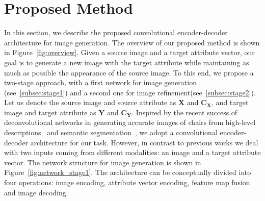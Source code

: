 \documentclass[10pt,twocolumn,letterpaper]{article}
\begin{document}
\section{Proposed Method}
\label{sec:method}
In this section, we describe the proposed convolutional encoder-decoder architecture for image generation. The overview of our proposed method is shown in Figure~\ref{fig:overview}.
Given a source image and a target attribute vector, our goal is to generate a new image with the target attribute while maintaining as much as possible the appearance of the source image. To this end, we propose a two-stage approach, with a first network for image generation (see~\ref{subsec:stage1}) and a second one for image refinement(see~\ref{subsec:stage2}).
Let us denote the source image and source attribute as $\mathbf{X}$ and $\mathbf{C_X}$, and target image and target attribute as $\mathbf{Y}$ and $\mathbf{C_Y}$.
Inspired by the recent success of deconvolutional networks in generating accurate images of chairs
from high-level descriptions~\cite{Dosovitskiy-cvpr15} and semantic segmentation~\cite{Long-cvpr15,Noh-iccv15},
we adopt a convolutional encoder-decoder architecture for our task.
However, in contrast to previous works we deal with two inputs coming from different modalities:
an image and a target attribute vector.
The network structure for image generation is shown in Figure~\ref{fig:network_stage1}.
The architecture can be conceptually divided into four operations:
image encoding, attribute vector encoding, feature map fusion and image decoding.
\end{document}
